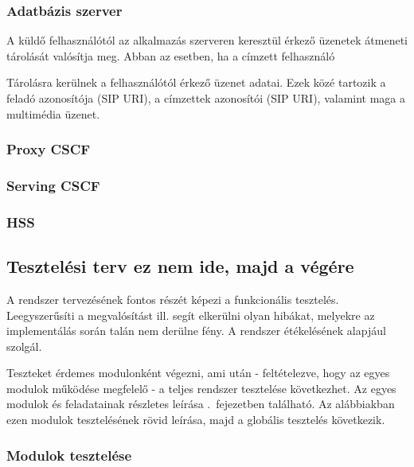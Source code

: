 \subsubsection{Adatbázis szerver}
\label{sec:adatbszerver}

A küldő felhasználótól az alkalmazás szerveren keresztül érkező üzenetek átmeneti tárolását valósítja meg. Abban az esetben, ha a címzett felhasználó 

Tárolásra kerülnek a felhasználótól érkező üzenet adatai. Ezek közé tartozik
a feladó azonosítója (SIP URI), a címzettek azonosítói (SIP URI), valamint maga a multimédia üzenet.

\subsubsection{Proxy CSCF}
\label{sec:p_cscf}

\subsubsection{Serving CSCF}
\label{sec:s_cscf}

\subsubsection{HSS}
\label{sec:hss}

\subsection{Tesztelési terv ez nem ide, majd a végére}
\label{sec:tesztelesi_terv}

A rendszer tervezésének fontos részét képezi a funkcionális tesztelés. Leegyszerűsíti a megvalósítást ill. segít elkerülni olyan hibákat, melyekre az imp\-le\-men\-tá\-lás során talán nem derülne fény. A rendszer étékelésének alapjául szolgál.

Teszteket érdemes modulonként végezni, ami után - feltételezve, hogy az egyes mo\-du\-lok működése megfelelő - a teljes rendszer tesztelése következhet. %
Az egyes modulok és feladatainak részletes leírása .~fejezetben található. Az alábbiakban ezen modulok tesztelésének rövid leírása, majd a globális tesztelés következik.

\subsubsection{Modulok tesztelése}

